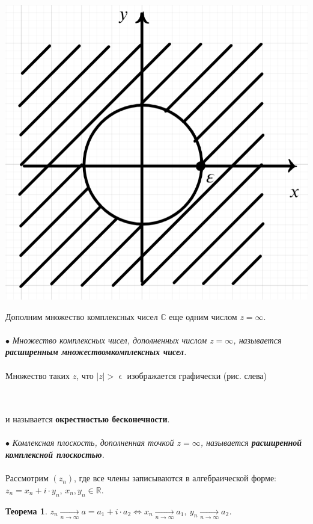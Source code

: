 \documentclass[a4paper, 12pt]{article}
\newcommand{\Rm}{\mathbb{R}}
\newcommand{\Cm}{\mathbb{C}}
\renewcommand{\epsilon}{\upvarepsilon}
\newtheorem*{theorem}{Теорема}
\begin{document}
\parbox[b][4.5cm][t]{10mm}{
	\includegraphics[scale=0.25]{images/014.png}}
\hfill
\parbox[b][4.5cm][t]{110mm}{Дополним множество комплексных чисел $\Cm$ еще одним числом $z = \infty$.\\\\
	$\bullet$ \textit{Множество комплексных чисел, дополненных числом $z = \infty$, называется \textbf{расширенным множествомкомплексных чисел}.}\\\\
	Множество таких $z$, что $|z|>\epsilon$ изображается графически (рис. слева)}\\\\
и называется \textbf{окрестностью бесконечности}.\\\\
$\bullet$ \textit{Комлексная плоскость, дополненная точкой $z = \infty$, называется \textbf{расширенной комплексной плоскостью}.}\\\\
Рассмотрим $(z_n)$, где все члены записываются в алгебраической форме: $z_n = x_n + i\cdot y_n$, $x_n,y_n \in \Rm$.
\begin{theorem}
	$z_n \underset{n\to\infty}{\longrightarrow} a = a_1 + i\cdot a_2 \Longleftrightarrow x_n \underset{n\to\infty}{\longrightarrow} a_1,\ y_n \underset{n\to\infty}{\longrightarrow}a_2$.
\end{theorem}
\end{document}
